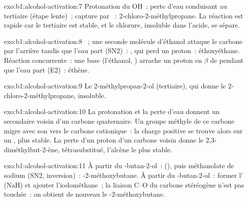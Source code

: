 \begin{solution}{exo:b1:alcohol-activation:7}
Protonation du OH~; perte d'eau conduisant au  tertiaire
(étape lente)~; capture par ~: 2-chloro-2-méthylpropane. La
réaction est rapide car le  tertiaire est stable, et le
chlorure, insoluble dans l'acide, se sépare.
\end{solution}

\begin{solution}{exo:b1:alcohol-activation:8}
~; une seconde molécule d'éthanol attaque
le carbone par l'arrière tandis que l'eau part (SN2)~:
, qui perd un proton~: éthoxyéthane. Réaction
concurrente~: une base (l'éthanol, ) arrache un proton en
$\beta$ de  pendant que l'eau part (E2)~: éthène.
\end{solution}

\begin{solution}{exo:b1:alcohol-activation:9}
Le 2-méthylpropan-2-ol (tertiaire), qui donne le 2-chloro-2-méthylpropane, insoluble.
\end{solution}

\begin{solution}{exo:b1:alcohol-activation:10}
La protonation et la perte d'eau donnent un  secondaire voisin
d'un carbone quaternaire. Un groupe méthyle de ce carbone migre avec son
 vers le carbone cationique~: la charge positive se trouve
alors sur un , plus stable. La perte d'un proton d'un
carbone voisin donne le 2,3-diméthylbut-2-ène, tétrasubstitué, l'alcène
le plus stable.
\end{solution}

\begin{solution}{exo:b1:alcohol-activation:11}
À partir du -butan-2-ol~:  (), puis méthanolate de
sodium (SN2, inversion)~: -2-méthoxybutane. À partir du
-butan-2-ol~: former l' (NaH) et ajouter l'iodométhane~;
la liaison C--O du carbone stéréogène n'est pas touchée~: on obtient de
nouveau le -2-méthoxybutane.
\end{solution}

